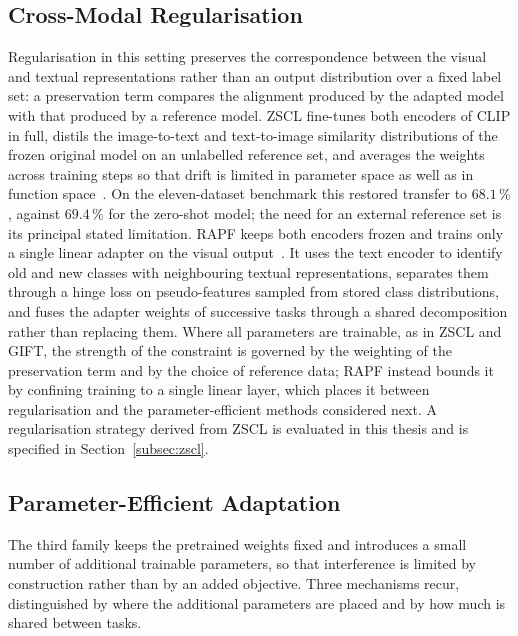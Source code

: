\subsection{Cross-Modal Regularisation}

Regularisation in this setting preserves the correspondence between the visual and textual representations rather than an output distribution over a fixed label set: a preservation term compares the alignment produced by the adapted model with that produced by a reference model. ZSCL fine-tunes both encoders of CLIP in full, distils the image-to-text and text-to-image similarity distributions of the frozen original model on an unlabelled reference set, and averages the weights across training steps so that drift is limited in parameter space as well as in function space~\cite{zheng2023preventingzeroshottransferdegradation}. On the eleven-dataset benchmark this restored transfer to $68.1\,\%$, against $69.4\,\%$ for the zero-shot model; the need for an external reference set is its principal stated limitation. RAPF keeps both encoders frozen and trains only a single linear adapter on the visual output~\cite{huang2024classincrementallearningclipadaptive}. It uses the text encoder to identify old and new classes with neighbouring textual representations, separates them through a hinge loss on pseudo-features sampled from stored class distributions, and fuses the adapter weights of successive tasks through a shared decomposition rather than replacing them. Where all parameters are trainable, as in ZSCL and GIFT, the strength of the constraint is governed by the weighting of the preservation term and by the choice of reference data; RAPF instead bounds it by confining training to a single linear layer, which places it between regularisation and the parameter-efficient methods considered next. A regularisation strategy derived from ZSCL is evaluated in this thesis and is specified in Section~\ref{subsec:zscl}.

\subsection{Parameter-Efficient Adaptation}

The third family keeps the pretrained weights fixed and introduces a small number of additional trainable parameters, so that interference is limited by construction rather than by an added objective. Three mechanisms recur, distinguished by where the additional parameters are placed and by how much is shared between tasks.

